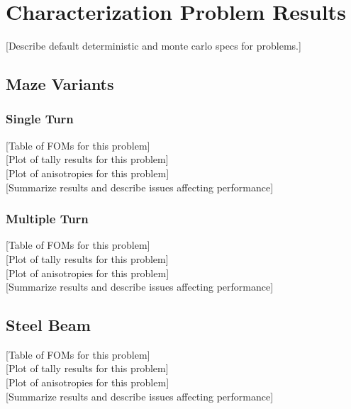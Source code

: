 \section{Characterization Problem Results}
\label{sec:CharResults}

[Describe default deterministic and monte carlo specs for problems.]

\subsection{Maze Variants}
\label{subsec:resultsmaze}
\subsubsection{Single Turn}
[Table of FOMs for this problem] \\

[Plot of tally results for this problem] \\

[Plot of anisotropies for this problem] \\

[Summarize results and describe issues affecting performance] \\

\subsubsection{Multiple Turn}
[Table of FOMs for this problem]\\

[Plot of tally results for this problem]\\

[Plot of anisotropies for this problem] \\

[Summarize results and describe issues affecting performance] \\

\subsection{Steel Beam}
\label{subsec:resultbeam}
[Table of FOMs for this problem] \\

[Plot of tally results for this problem] \\

[Plot of anisotropies for this problem] \\

[Summarize results and describe issues affecting performance] \\

